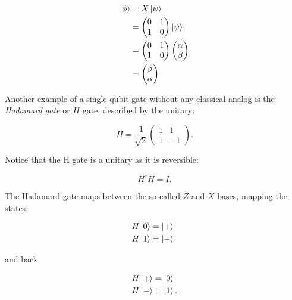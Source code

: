 \begin{align}
  \Ket{\phi} &= X \Ket{\psi} \\
             &=
               \begin{pmatrix}
                 0 & 1 \\
                 1 & 0
               \end{pmatrix}
                \Ket{\psi} \\
             &= \begin{pmatrix}
                 0 & 1 \\
                 1 & 0
               \end{pmatrix}
                \begin{pmatrix}
                  \alpha \\
                  \beta
                \end{pmatrix} \\
             &= \begin{pmatrix}
                 \beta \\
                 \alpha
               \end{pmatrix}
\end{align}

Another example of a single qubit gate without any classical analog is the
\textit{Hadamard gate} or $H$ gate, described by the unitary:

\begin{equation}
  H = \frac{1}{\sqrt{2}}
  \begin{pmatrix}
    1 & 1 \\
    1 & -1
  \end{pmatrix}.
\end{equation}

Notice that the H gate is a unitary as it is reversible:

\begin{equation}
   H^{\dagger} H = I.
\end{equation}

The Hadamard gate maps between the so-called $Z$ and $X$ bases, mapping the
states:

\begin{align}
  H \Ket{0} &= \Ket{+} \\
  H \Ket{1} &= \Ket{-} \phantom{.}
\end{align}

and back

\begin{align}
  H \Ket{+} &= \Ket{0} \\
  H \Ket{-} &= \Ket{1}.
\end{align}

